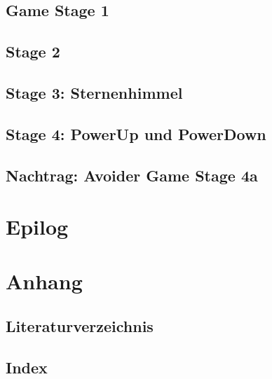 \documentclass[10pt,german,]{book}
\begin{document}
\section{Game Stage 1}\label{game-stage-1}

\section{Stage 2}\label{stage-2}

\section{Stage 3: Sternenhimmel}\label{stage-3-sternenhimmel}

\section{Stage 4: PowerUp und
PowerDown}\label{stage-4-powerup-und-powerdown}

\section{Nachtrag: Avoider Game Stage
4a}\label{nachtrag-avoider-game-stage-4a}

\chapter{Epilog}\label{epilog}

\chapter{Anhang}\label{anhang}

\section{Literaturverzeichnis}\label{literaturverzeichnis}

\section{Index}\label{index}
\end{document}
